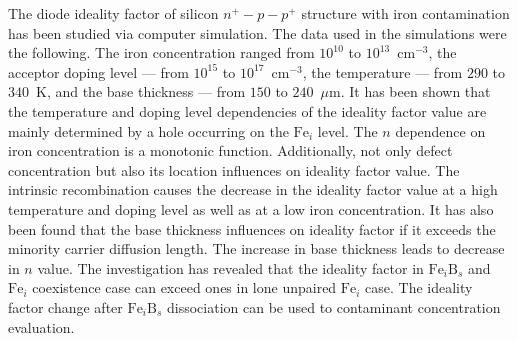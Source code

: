 \documentclass[12pt]{article}
\begin{document}
The diode ideality factor of silicon $n^+-p-p^+$ structure with iron contamination has been studied via computer simulation.
The data used in the simulations were the following.
The iron concentration ranged from $10^{10}$ to $10^{13}$~cm$^{-3}$,
the acceptor doping level --- from $10^{15}$ to $10^{17}$~cm$^{-3}$,
the temperature --- from $290$ to $340$~K,
and the base thickness --- from $150$ to $240$~$\mu$m.
It has been shown that the temperature and doping level dependencies of the ideality factor value
are mainly determined by a hole occurring on the $\mathrm{Fe}_i$ level.
The $n$ dependence on iron concentration is a monotonic function.
Additionally, not only defect concentration but also its location influences on  ideality factor value.
The intrinsic recombination causes the decrease in the ideality factor value at a high temperature and doping level as well as at a low iron concentration.
It has also been found that the base thickness influences on ideality factor if it exceeds the minority carrier diffusion length.
The increase in base thickness leads to decrease in $n$ value.
The investigation has revealed that the ideality factor in $\mathrm{Fe}_i\mathrm{B}_s$ and $\mathrm{Fe}_i$ coexistence case
can exceed ones in lone unpaired $\mathrm{Fe}_i$ case.
The ideality factor change after $\mathrm{Fe}_i\mathrm{B}_s$ dissociation can be used to contaminant concentration evaluation.


\end{document}

